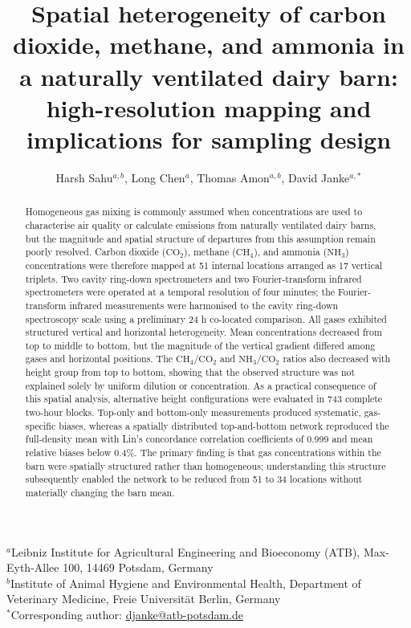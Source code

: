 \documentclass[12pt,a4paper]{article}
\title{Spatial heterogeneity of carbon dioxide, methane, and ammonia in a naturally ventilated dairy barn: high-resolution mapping and implications for sampling design}
\author{
Harsh Sahu$^{a,b}$,
Long Chen$^{a}$,
Thomas Amon$^{a,b}$,
David Janke$^{a,*}$
}
\date{}
\begin{document}
\maketitle

\begin{center}
\small
$^{a}$Leibniz Institute for Agricultural Engineering and Bioeconomy (ATB),
Max-Eyth-Allee 100, 14469 Potsdam, Germany\\
$^{b}$Institute of Animal Hygiene and Environmental Health, Department of
Veterinary Medicine, Freie Universit\"at Berlin, Germany\\
$^{*}$Corresponding author: \href{mailto:djanke@atb-potsdam.de}{djanke@atb-potsdam.de}
\end{center}

\begin{abstract}
Homogeneous gas mixing is commonly assumed when concentrations are used to
characterise air quality or calculate emissions from naturally ventilated
dairy barns, but the magnitude and spatial structure of departures from this
assumption remain poorly resolved. Carbon dioxide (\(\mathrm{CO_2}\)),
methane (\(\mathrm{CH_4}\)), and ammonia (\(\mathrm{NH_3}\)) concentrations
were therefore mapped at 51 internal locations arranged as 17 vertical
triplets. Two cavity ring-down spectrometers and two Fourier-transform infrared
spectrometers were operated at a temporal resolution of four minutes; the
Fourier-transform infrared measurements were harmonised to the cavity
ring-down spectroscopy scale using a preliminary 24 h co-located comparison.
All gases exhibited structured vertical and horizontal heterogeneity. Mean
concentrations decreased from top to middle to bottom, but the magnitude of
the vertical gradient differed among gases and horizontal positions. The
\(\mathrm{CH_4}/\mathrm{CO_2}\) and
\(\mathrm{NH_3}/\mathrm{CO_2}\) ratios also decreased with height group from
top to bottom, showing that the observed structure was not explained solely by
uniform dilution or concentration. As a practical consequence of this spatial
analysis, alternative height configurations were evaluated in 743 complete
two-hour blocks. Top-only and bottom-only measurements produced systematic,
gas-specific biases, whereas a spatially distributed top-and-bottom network
reproduced the full-density mean with Lin's concordance correlation
coefficients of 0.999 and mean relative biases below 0.4\%. The primary finding
is that gas concentrations within the barn were spatially structured rather
than homogeneous; understanding this structure subsequently enabled the
network to be reduced from 51 to 34 locations without materially changing the
barn mean.
\end{abstract}
\end{document}

